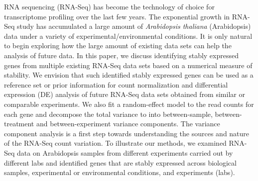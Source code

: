 	RNA sequencing (RNA-Seq) has become the technology of choice for transcriptome
	profiling over the last few years. The exponential growth in RNA-Seq study has
	accumulated a large amount of \textit{Arabidopsis thaliana} (Arabidopsis) data under a variety of experimental/environmental conditions.  It is only natural to begin exploring
	how the large amount of existing data sets can help the analysis of future
	data.  In this paper, we discuss identifying stably expressed genes from
	multiple existing RNA-Seq data sets based on a numerical measure of stability.
	We envision that such identified stably expressed genes can be used as a
	reference set or prior information for count normalization and differential
	expression (DE) analysis of future RNA-Seq data sets obtained from similar or
	comparable experiments.  We also fit a random-effect model to the read counts
	for each gene and decompose the total variance to into between-sample,
	between-treatment and between-experiment variance components. The variance component
	analysis is a first step towards understanding the sources and nature of the
	RNA-Seq count variation.  To illustrate our methods, we examined RNA-Seq data
	on \howmanySamples Arabidopsis  samples from \howmanylab different experiments carried out by
	different labs and identified genes that are stably expressed across
	biological samples, experimental or environmental conditions, and experiments
	(labs).  
	
